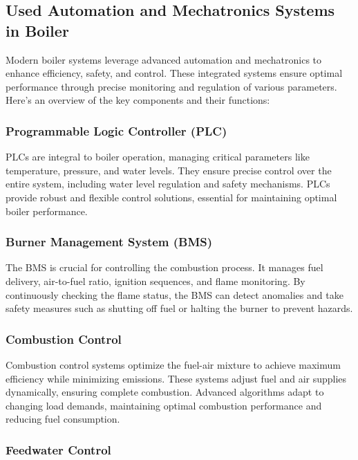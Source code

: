 \subsection{Used Automation and Mechatronics Systems in Boiler}

Modern boiler systems leverage advanced automation and mechatronics to enhance efficiency, safety, and control. These integrated systems ensure optimal performance through precise monitoring and regulation of various parameters. Here’s an overview of the key components and their functions:

\subsubsection{Programmable Logic Controller (PLC)}

PLCs are integral to boiler operation, managing critical parameters like temperature, pressure, and water levels. They ensure precise control over the entire system, including water level regulation and safety mechanisms. PLCs provide robust and flexible control solutions, essential for maintaining optimal boiler performance.

\subsubsection{Burner Management System (BMS)}

The BMS is crucial for controlling the combustion process. It manages fuel delivery, air-to-fuel ratio, ignition sequences, and flame monitoring. By continuously checking the flame status, the BMS can detect anomalies and take safety measures such as shutting off fuel or halting the burner to prevent hazards.

\subsubsection{Combustion Control}

Combustion control systems optimize the fuel-air mixture to achieve maximum efficiency while minimizing emissions. These systems adjust fuel and air supplies dynamically, ensuring complete combustion. Advanced algorithms adapt to changing load demands, maintaining optimal combustion performance and reducing fuel consumption.

\subsubsection{Feedwater Control}


